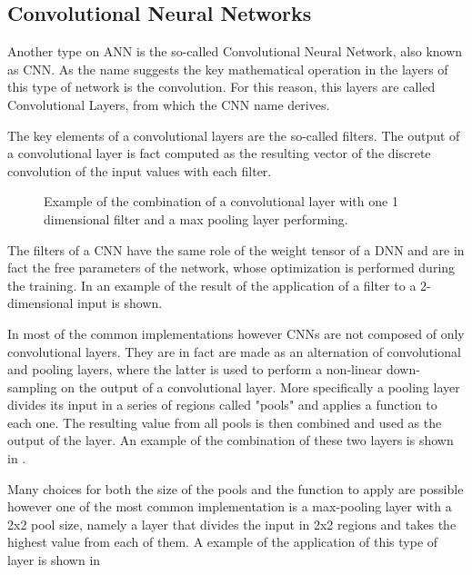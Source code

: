 \subsection{Convolutional Neural Networks}\label{cnn}

Another type on ANN is the so-called Convolutional Neural Network, also known as CNN. As the name suggests the key mathematical operation in the layers of this type of network is the convolution. For this reason, this layers are called Convolutional Layers, from which the CNN name derives.

The key elements of a convolutional layers are the so-called filters. The output of a convolutional layer is fact computed as the resulting vector of the discrete convolution of the input values with each filter. 

\begin{figure}
    \centering
  
    \caption{Example of the combination of a convolutional layer with one 1 dimensional filter and a max pooling layer performing.  }
    \label{fig:cnn_tot}
    \vspace{-1cm}
\end{figure}
The filters of a CNN have the same role of the weight tensor of a DNN and are in fact the free parameters of the network, whose optimization is performed during the training. In  an example of the result of the application of a filter to a 2-dimensional input is shown.

In most of the common implementations however CNNs are not composed of only convolutional layers. They are in fact are made as an alternation of convolutional and pooling layers, where the latter is used to  perform a non-linear down-sampling on the output of a convolutional layer. 
More specifically a pooling layer divides its input in a series of regions called "pools" and applies a function to each one.
The resulting value from all pools is then combined and used as the output of the layer.
An example of the combination of these two layers is shown in .

Many choices for both the size of the pools and the function to apply are possible however one of the most common implementation is a max-pooling layer with a 2x2 pool size, namely a layer that divides the input in 2x2 regions and takes the highest value from each of them. A example of the application of this type of layer is shown in  

